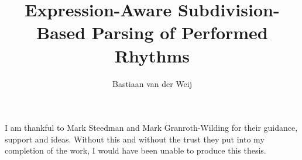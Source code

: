 \documentclass[logo,msc,cogsci]{infthesis/infthesis}
\title{Expression-Aware Subdivision-Based Parsing of Performed Rhythms}
\author{Bastiaan van der Weij}
\begin{document}
\begin{preliminary}
\maketitle
\begin{acknowledgements}

I am thankful to Mark Steedman and Mark Granroth-Wilding for their guidance, support and ideas. Without this and without the trust they put into my completion of the work, I would have been unable to produce this thesis.

\end{acknowledgements}

\standarddeclaration


\tableofcontents


\end{preliminary}



%
%





%
\appendix




\end{document}
